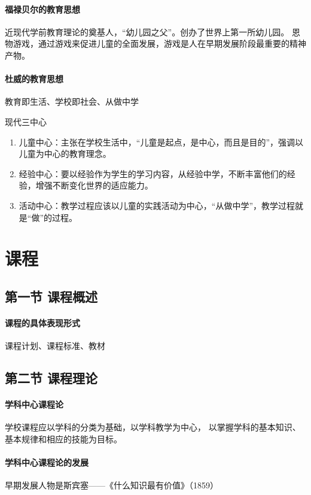 \documentclass[b5paper,11pt]{article}
\begin{document}
\paragraph{福禄贝尔的教育思想} \textcolor{ctp-red}{近现代学前教育理论的奠基人}，“幼儿园之父”。创办了世界上第一所幼儿园。
\textcolor{ctp-red}{恩物游戏}，通过游戏来促进儿童的全面发展，游戏是人在早期发展阶段最重要的精神产物。

\paragraph{杜威的教育思想} \textcolor{ctp-red}{教育即生活、学校即社会、从做中学}

\textcolor{ctp-red}{现代三中心}
\begin{enumerate}
  \item 儿童中心：主张在学校生活中，“儿童是起点，是中心，而且是目的”，强调以儿童为中心的教育理念。
  \item 经验中心：要以经验作为学生的学习内容，从经验中学，不断丰富他们的经验，增强不断变化世界的适应能力。
  \item 活动中心：教学过程应该以儿童的实践活动为中心，“从做中学”，教学过程就是“做”的过程。
\end{enumerate}

\section{课程}
\subsection{第一节 课程概述}
\paragraph{课程的具体表现形式} \textcolor{ctp-red}{课程计划、课程标准、教材}

\subsection{第二节 课程理论}
\paragraph{学科中心课程论} 学校课程应以学科的分类为基础，\textcolor{ctp-red}{以学科教学为中心}，
以掌握学科的基本知识、基本规律和相应的技能为目标。

\paragraph{学科中心课程论的发展} 早期发展人物是\textcolor{ctp-red}{斯宾塞}——《什么知识最有价值》（1859）
\end{document}
